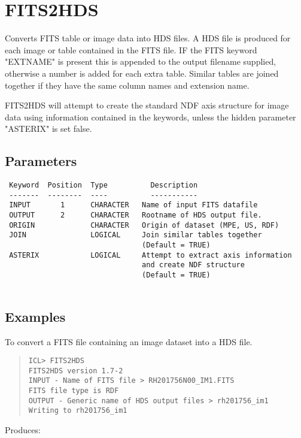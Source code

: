 \documentclass{book}
\renewcommand{\_}{{\tt\char'137}}     %
\begin{document}
\section{FITS2HDS}
Converts FITS table or image data into HDS files.
A HDS file is produced for each image or table contained in the
FITS file. IF the FITS keyword "EXTNAME" is present this is
appended to the output filename supplied, otherwise a number is
added for each extra table. Similar tables are joined together
if they have the same column names and extension name.
 
FITS2HDS will attempt to create the standard NDF axis structure
for image data using information contained in the keywords, unless
the hidden parameter "ASTERIX" is set false.
 
\subsection{Parameters}
\begin{verbatim}
 Keyword  Position  Type          Description
 -------  --------  ----          -----------
 INPUT       1      CHARACTER   Name of input FITS datafile
 OUTPUT      2      CHARACTER   Rootname of HDS output file.
 ORIGIN             CHARACTER   Origin of dataset (MPE, US, RDF)
 JOIN               LOGICAL     Join similar tables together
                                (Default = TRUE)
 ASTERIX            LOGICAL     Attempt to extract axis information
                                and create NDF structure
                                (Default = TRUE)
 
\end{verbatim}\subsection{Examples}
To convert a FITS file containing an image dataset into a HDS file.
\begin{quote}\begin{verbatim}
ICL> FITS2HDS
FITS2HDS version 1.7-2
INPUT - Name of FITS file > RH201756N00_IM1.FITS
FITS file type is RDF
OUTPUT - Generic name of HDS output files > rh201756_im1
Writing to rh201756_im1
\end{verbatim}\end{quote}
Produces:
\end{document}
